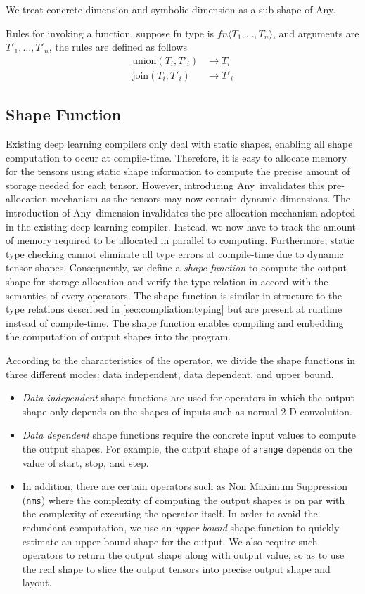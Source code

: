 We treat concrete dimension and symbolic dimension as a sub-shape of Any.

Rules for invoking a function, suppose fn type is $fn\langle T_1, \dots, T_n\rangle$,
and arguments are $T'_1, \dots, T'_n$, the rules are defined as follows
\begin{align*}
  \textrm{union}(T_i, T'_i) &\rightarrow T_i \\
  \textrm{join}(T_i, T'_i) &\rightarrow T'_i
\end{align*}

\subsection{Shape Function}
\label{sec:compilation:shape-func}
Existing deep learning compilers only deal with static shapes,
  enabling all shape computation to occur at compile-time.
Therefore, it is easy to allocate memory for the tensors
  using static shape information to compute the precise amount of storage needed for each tensor.
However, introducing Any~invalidates this pre-allocation
  mechanism as the tensors may now contain dynamic dimensions.
The introduction of Any~dimension invalidates the pre-allocation
  mechanism adopted in the existing deep learning compiler.
Instead, we now have to track the amount of memory required to be allocated in parallel to computing.
Furthermore, static type checking cannot eliminate all
  type errors at compile-time due to dynamic tensor shapes.
Consequently, we define a {\em shape function} to compute the output shape
  for storage allocation and verify the type relation in accord with the semantics of every operators.
The shape function is similar in structure to the type relations described in
  \autoref{sec:compliation:typing} but are present at runtime instead of compile-time.
The shape function enables compiling and embedding the computation of output shapes into the program.

According to the characteristics of the operator, we divide the shape functions
  in three different modes: data independent, data dependent, and upper bound.
\begin{itemize}
  \item {\em Data independent} shape functions are used for operators in which the output shape
        only depends on the shapes of inputs such as normal 2-D convolution.
  \item {\em Data dependent} shape functions require the concrete input values to compute the output shapes.
        For example, the output shape of \texttt{arange} depends on the value of start, stop, and step.
  \item In addition, there are certain operators such as Non Maximum Suppression (\texttt{nms}) where the
        complexity of computing the output shapes is on par with the complexity of executing the operator itself.
  In order to avoid the redundant computation, we use an {\em upper bound} shape function to quickly estimate an upper bound shape for the output.
  We also require such operators to return the output shape along with output value, so as to use the real shape to slice the output tensors into precise output shape and layout.
\end{itemize}

